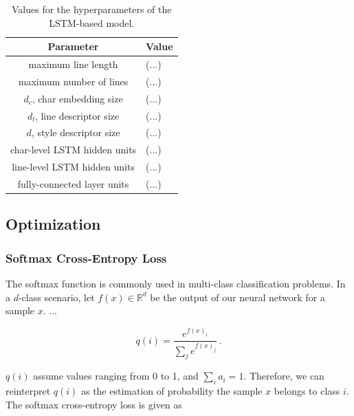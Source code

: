 \begin{table}[htbp]
	\centering
	\begin{tabular}{c|l}
		\hline
		\textbf{Parameter}           & \multicolumn{1}{c}{\textbf{Value}} \\ \hline
		maximum line length   & (...)                            \\ \hline
		maximum number of lines   & (...)                            \\ \hline
		$d_c$, char embedding size   & (...)                            \\ \hline
		$d_l$, line descriptor size  & (...)                            \\ \hline
		$d$, style descriptor size & (...)                            \\ \hline
		char-level LSTM hidden units & (...)                            \\ \hline
		line-level LSTM hidden units & (...)                            \\ \hline
		fully-connected layer units  & (...)                            \\ \hline
	\end{tabular}
	\caption{Values for the hyperparameters of the LSTM-based model.}
	\label{tab:lstm_hyper}
\end{table}

\subsection{Optimization}\label{sec:optimization}

\subsubsection{Softmax Cross-Entropy Loss}\label{sec:softmax}

The softmax function is commonly used in multi-class classification problems. In a $d$-class scenario, let $f(x) \in \mathbb{R}^d$ be the output of our neural network for a sample $x$. ...

\begin{equation}
q(i) = \frac{e^{f(x)_i}}{\sum_j e^{f(x)_j}} \,.
\end{equation}

$q(i)$ assume values ranging from 0 to 1, and $\sum_i a_i = 1$. Therefore, we can reinterpret $q(i)$ as the estimation of probability the sample $x$ belongs to class $i$. The softmax cross-entropy loss is given as

